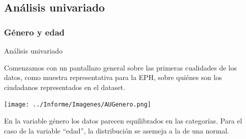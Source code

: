 \documentclass[pdf]{beamer}
\begin{document}

\subsection{Análisis univariado}

    \subsubsection{Género y edad}

\begin{frame}{Análisis univariado}

    Comenzamos con un pantallazo general sobre las primeras cualidades de los datos, como muestra representativa para la EPH, sobre quiénes son los ciudadanos representados en el dataset.

    \begin{center}
        \texttt{[image: ../Informe/Imagenes/AUGenero.png]}
    \end{center}

    En la variable género los datos parecen equilibrados en las categorías. Para el caso de la variable ``edad'', la distribución se asemeja a la de una normal.

\end{frame}
              


    
           
\end{document}
